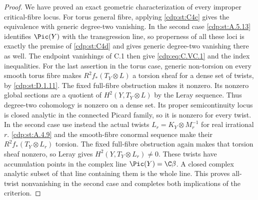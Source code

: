 \begin{proof}
We have proved an exact geometric characterization of
every improper critical-fibre locus. For torus general
fibre, applying \ref{cdp:st:C4c} gives the equivalence with generic
degree-two vanishing. In the second case \ref{cdp:st:A.5.13} identifies
$\Pic(Y)$ with the transgression line, so properness of
all these loci is exactly the premise of \ref{cdp:st:C4d} and gives
generic degree-two vanishing there as well.
The endpoint vanishings of C.1 then give \eqref{cdp:eq:C.VC.1} and the
index inequalities.
For the last assertion in the torus case, generic non-torsion on every
smooth torus fibre makes $R^2f_*(T_Y\otimes L)$ a
torsion sheaf for a dense set of twists, by \ref{cdp:st:D.1.11}.
The fixed full-fibre obstruction makes it nonzero.
Its nonzero global sections are a quotient of
$H^2(Y,T_Y\otimes L)$ by the Leray sequence.
Thus degree-two cohomology is nonzero on a dense set.
Its proper semicontinuity locus is closed analytic in
the connected Picard family, so it is nonzero for every
twist. In the second case use instead the actual twists
$L_r=K_Y\otimes M_r^{-1}$ for real irrational $r$.
\ref{cdp:st:A.4.9} and the smooth-fibre conormal sequence make their
$R^2f_*(T_Y\otimes L_r)$ torsion. The fixed full-fibre
obstruction again makes that torsion sheaf nonzero,
so Leray gives $H^2(Y,T_Y\otimes L_r)\ne0$.
These twists have accumulation points in the complex
line $\Pic(Y)=\C\beta$. A closed complex analytic subset
of that line containing them is the whole line.
This proves all-twist nonvanishing in the second case
and completes both implications of the criterion.
\end{proof}



